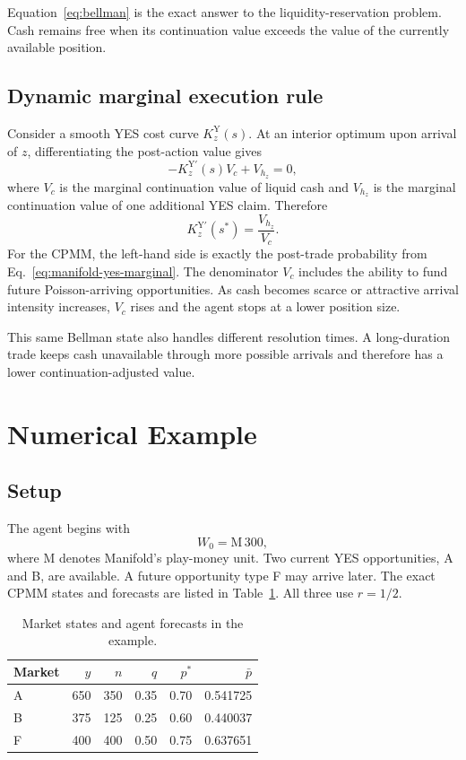 \documentclass[journal, a4paper]{IEEEtran}
\begin{document}
Equation~\eqref{eq:bellman} is the exact answer to the liquidity-reservation problem. Cash remains free when its continuation value exceeds the value of the currently available position.

\subsection{Dynamic marginal execution rule}
Consider a smooth YES cost curve $K_z^{\mathrm{Y}}(s)$. At an interior optimum upon arrival of $z$, differentiating the post-action value gives
\begin{equation}
-K_z^{\mathrm{Y}\prime}(s)V_c+V_{h_z}=0,
\end{equation}
where $V_c$ is the marginal continuation value of liquid cash and $V_{h_z}$ is the marginal continuation value of one additional YES claim. Therefore
\begin{equation}
K_z^{\mathrm{Y}\prime}(s^*)
=
\frac{V_{h_z}}{V_c}.
\label{eq:dynamic-marginal-rule}
\end{equation}
For the  CPMM, the left-hand side is exactly the post-trade probability from Eq.~\eqref{eq:manifold-yes-marginal}. The denominator $V_c$ includes the ability to fund future Poisson-arriving opportunities. As cash becomes scarce or attractive arrival intensity increases, $V_c$ rises and the agent stops at a lower position size.

This same Bellman state also handles different resolution times. A long-duration trade keeps cash unavailable through more possible arrivals and therefore has a lower continuation-adjusted value.

\section{Numerical Example}
\subsection{Setup}
The agent begins with
\begin{equation}
W_0=\text{M}\,300,
\end{equation}
where M denotes Manifold's play-money unit. Two current YES opportunities, A and B, are available. A future opportunity type F may arrive later. The exact CPMM states and forecasts are listed in Table~\ref{tab:example-markets}. All three use $r=1/2$.

\begin{table}[!t]
\centering
\caption{Market states and agent forecasts in the example.}
\label{tab:example-markets}
\begin{tabular}{@{}lrrrrr@{}}
\toprule
Market & $y$ & $n$ & $q$ & $p^*$ & $\bar p$\\
\midrule
A & 650 & 350 & 0.35 & 0.70 & 0.541725\\
B & 375 & 125 & 0.25 & 0.60 & 0.440037\\
F & 400 & 400 & 0.50 & 0.75 & 0.637651\\
\bottomrule
\end{tabular}
\end{table}
\end{document}
